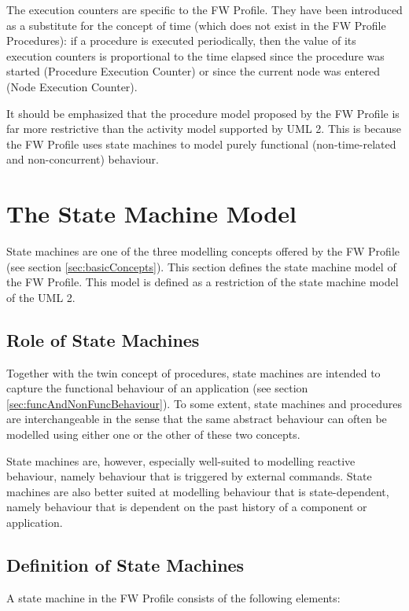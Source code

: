 \documentclass[a4paper,10pt]{article}
\let\stdsection\section
\renewcommand\section{\newpage\stdsection}
\begin{document}
The execution counters are specific to the FW Profile. They have been introduced as a
substitute for the concept of time (which does not exist in the FW Profile Procedures): 
if a procedure is executed periodically, then the value of its execution 
counters is proportional to the time elapsed since the procedure was started (Procedure
Execution Counter) or since the current node was entered (Node Execution Counter). 

It should be emphasized that the procedure model proposed by the FW Profile is far more
restrictive than the activity model supported by UML 2. This is because the FW Profile uses
state machines to model purely functional (non-time-related and non-concurrent) behaviour.

\newpage

\section{The State Machine Model}
State machines are one of the three modelling concepts offered by the FW Profile (see section \ref{sec:basicConcepts}). 
This section defines the state machine model of the FW Profile. This model is defined as
a restriction of the state machine model of the UML 2.

\subsection{Role of State Machines}
Together with the twin concept of procedures, state machines are intended to capture the
functional behaviour of an application (see section \ref{sec:funcAndNonFuncBehaviour}). To some extent, state machines and
procedures are interchangeable in the sense that the same abstract behaviour can often be
modelled using either one or the other of these two concepts.

State machines are, however, especially well-suited to modelling reactive behaviour, namely
behaviour that is triggered by external commands. State machines are also better suited at
modelling behaviour that is state-dependent, namely behaviour that is dependent on the past
history of a component or application.


\subsection{Definition of State Machines}\label{sec:smDefinition}
A state machine in the FW Profile consists of the following elements:
\end{document}
